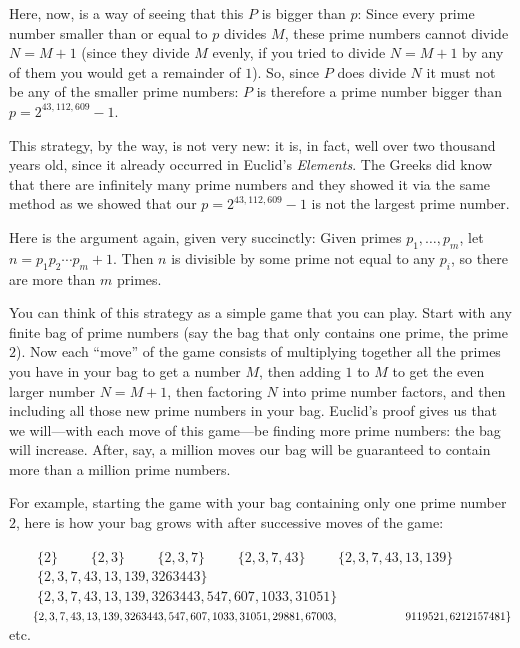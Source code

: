 \documentclass[openany]{book}
\theoremstyle{plain}
\theoremstyle{definition}
\begin{document}
Here, now, is a way of seeing that this $P$ is bigger than $p$: Since
every prime number smaller than or equal to $p$ divides $M$, these
prime numbers cannot divide $N= M+1$ (since they divide $M$ evenly, if
you tried to divide $N=M+1$ by any of them you would get a remainder
of $1$).  So, since $P$ does divide $N$ it must not be any of the
smaller prime numbers: $P$ is therefore a prime number bigger than $p=
2^{43,112,609}-1$.

This strategy, by the way, is not very new: it is, in fact, well over
two thousand years old, since it already occurred in Euclid's {\em
  Elements}. The Greeks did know that there are infinitely many prime
numbers and they showed it via the same method as we showed that our
$p = 2^{43,112,609} - 1$ is not the largest prime number.

Here is the argument again, given very succinctly: 
Given primes $p_1, \ldots, p_m$, let $n=p_1 p_2 \cdots p_m +
1$.  Then $n$ is divisible by some prime not equal to any $p_i$,
so there are more than $m$ primes. 

You can think of this strategy as a simple game that you can
play. Start with any finite bag of prime numbers (say the bag that
only contains one prime, the prime $2$). Now each ``move'' of the game
consists of multiplying together all the primes you have in your bag
to get a number $M$, then adding $1$ to $M$ to get the even larger
number $N=M+1$, then factoring $N$ into prime number factors, and then
including all those new prime numbers in your bag. Euclid's proof
gives us that we will---with each move of this game---be finding more
prime numbers: the bag will increase. After, say, a million moves our
bag will be guaranteed to contain more than a million prime numbers.

For example, starting the game with your bag containing
only one prime number $2$, here is how your bag grows with after
successive moves of the game:

$\mbox{}\qquad\{2\}$
\newline
$\mbox{}\qquad\{2,3\}$
\newline
$\mbox{}\qquad\{2,3, 7\}$
\newline
$\mbox{}\qquad\{2,3, 7, 43\}$
\newline
$\mbox{}\qquad\{2,3, 7, 43, 13, 139\}$
\newline
$\mbox{}\qquad\{2,3, 7, 43, 13, 139, 3263443\}$
\newline
$\mbox{}\qquad\{2,3, 7, 43, 13, 139, 3263443,  547, 607, 1033, 31051\}$
\newline
$\mbox{}\qquad\{2,3, 7, 43, 13, 139, 3263443,  547, 607, 1033, 31051, 29881, 67003,\\
\mbox{}\qquad\qquad\qquad 9119521, 6212157481\}$
\newline
\mbox{}\qquad{}etc. 
\end{document}
